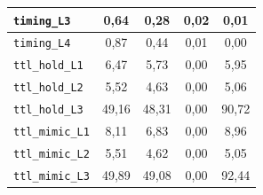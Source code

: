 \begin{table}[!ht]
\begin{tabular}{|l|c|c|c|c|}
        \hline
        \texttt{timing\_L3} & 0,64 & 0,28 & 0,02 & 0,01 \\
        \hline
        \texttt{timing\_L4} & 0,87 & 0,44 & 0,01 & 0,00 \\
        \hline
        \texttt{ttl\_hold\_L1} & 6,47 & 5,73 & 0,00 & 5,95 \\
        \hline
        \texttt{ttl\_hold\_L2} & 5,52 & 4,63 & 0,00 & 5,06 \\
        \hline
        \texttt{ttl\_hold\_L3} & 49,16 & 48,31 & 0,00 & 90,72 \\
        \hline
        \texttt{ttl\_mimic\_L1} & 8,11 & 6,83 & 0,00 & 8,96 \\
        \hline
        \texttt{ttl\_mimic\_L2} & 5,51 & 4,62 & 0,00 & 5,05 \\
        \hline
        \texttt{ttl\_mimic\_L3} & 49,89 & 49,08 & 0,00 & 92,44 \\
        \hline
    \end{tabular}
    \label{tab:anexa-o6-xgb}
\end{table}

